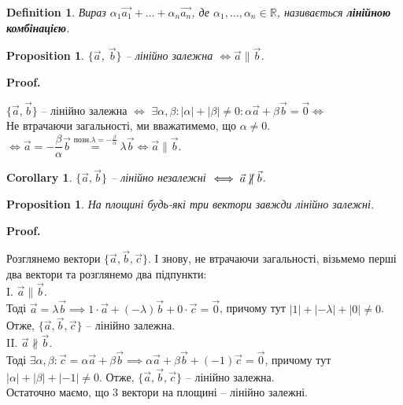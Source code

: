 \documentclass[a4paper, 10pt]{extarticle}
\makeatletter
\def\qed{$\blacksquare$}
\def\qed{$\blacksquare$}
\theoremstyle{theoremdd}
\theoremstyle{theoremdd}
\newtheorem{definition}[theorem]{Definition}
\theoremstyle{theoremdd}
\theoremstyle{theoremdd}
\theoremstyle{theoremdd}
\newtheorem{proposition}[theorem]{Proposition}
\theoremstyle{theoremdd}
\theoremstyle{theoremdd}
\theoremstyle{theoremdd}
\newtheorem{corollary}[theorem]{Corollary}
\renewenvironment{proof}[1][Proof.\\]{\par
\pushQED{\hfill \qed}%
\normalfont \topsep6\p@\@plus6\p@\relax
\trivlist
\item\relax
{\bfseries
#1\@addpunct{.}}\hspace\labelsep\ignorespaces
}{%
\popQED\endtrivlist\@endpefalse
}
\makeatother
\begin{document}
\begin{definition}
Вираз $\alpha_1 \vec{a_1} + \dots + \alpha_n \vec{a_n}$, де $\alpha_1, \dots, \alpha_n \in \mathbb{R}$, називається \textbf{лінійною комбінацією}.
\end{definition}

\begin{proposition}
$\{\vec{a}$, $\vec{b}\}$ -- лінійно залежна $\iff \vec{a} \parallel \vec{b}$.
\end{proposition}

\begin{proof}
	$\{\vec{a},\vec{b}\}$ -- лінійно залежна $\iff$ $\exists \alpha, \beta: |\alpha| + |\beta| \neq 0: \alpha \vec{a} + \beta \vec{b} = \vec{0} \boxed{\iff}$\\
	Не втрачаючи загальності, ми вважатимемо, що $\alpha \neq 0$.\\
	$\boxed{\iff} \vec{a} = -\dfrac{\beta}{\alpha} \vec{b} \overset{\text{позн.} \lambda = -\frac{\beta}{\alpha}}{=} \lambda \vec{b} \iff \vec{a} \parallel \vec{b}$.
\end{proof}

\begin{corollary}
$\{\vec{a}, \vec{b}\}$ -- лінійно незалежні $\iff \vec{a} \centernot\parallel \vec{b}$.
\end{corollary}

\begin{proposition}
	На площині будь-які три вектори завжди лінійно залежні.
\end{proposition}

\begin{proof}
	Розглянемо вектори $\{\vec{a},\vec{b},\vec{c}\}$. І знову, не втрачаючи загальності, візьмемо перші два вектори та розглянемо два підпункти:\\
	I. $\vec{a} \parallel \vec{b}$.\\
	Тоді $\vec{a} = \lambda \vec{b} \implies 1 \cdot \vec{a} + (-\lambda) \vec{b} + 0 \cdot \vec{c} = \vec{0}$, причому тут $|1|+|-\lambda|+|0| \neq 0$. \\
	Отже, $\{\vec{a}, \vec{b}, \vec{c}\}$ -- лінійно залежна.
	\bigskip \\
	II. $\vec{a} \not\parallel \vec{b}$.\\
	Тоді $\exists \alpha, \beta: \vec{c} = \alpha \vec{a} + \beta \vec{b} \implies \alpha \vec{a} + \beta \vec{b} + (-1) \vec{c} = \vec{0}$, причому тут $|\alpha| + |\beta| + |-1| \neq 0$. Отже, $\{\vec{a}, \vec{b}, \vec{c}\}$ -- лінійно залежна.\\
	Остаточно маємо, що 3 вектори на площині -- лінійно залежні.
\end{proof}
\end{document}

